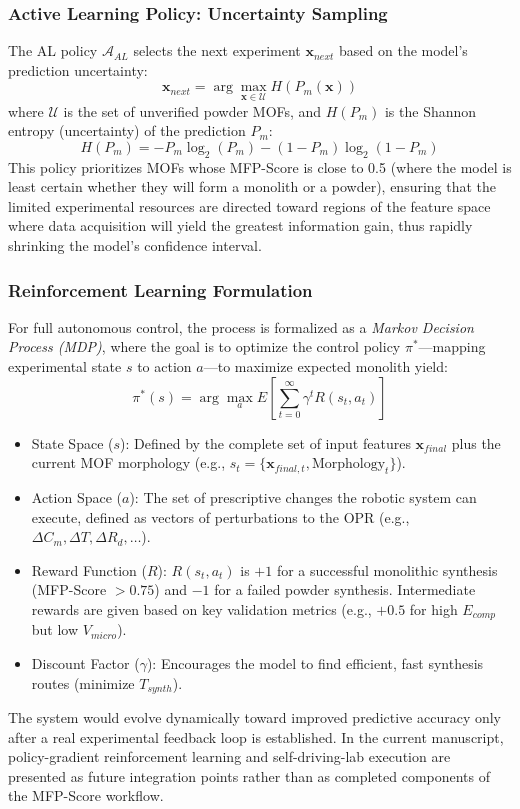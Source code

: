 \documentclass[12pt,a4paper]{article}
\begin{document}
\subsubsection{Active Learning Policy: Uncertainty Sampling}

The AL policy $\mathcal{A}_{AL}$ selects the next experiment $\mathbf{x}_{next}$ based on the model's prediction uncertainty:
\[
\mathbf{x}_{next} = \arg \max_{\mathbf{x} \in \mathcal{U}} H(P_m(\mathbf{x}))
\]
where $\mathcal{U}$ is the set of unverified powder MOFs, and $H(P_m)$ is the Shannon entropy (uncertainty) of the prediction $P_m$:
\[
H(P_m) = -P_m \log_2(P_m) - (1-P_m) \log_2(1-P_m)
\]
This policy prioritizes MOFs whose MFP-Score is close to 0.5 (where the model is least certain whether they will form a monolith or a powder), ensuring that the limited experimental resources are directed toward regions of the feature space where data acquisition will yield the greatest information gain, thus rapidly shrinking the model's confidence interval.

\subsubsection{Reinforcement Learning Formulation}

For full autonomous control, the process is formalized as a \textit{Markov Decision Process (MDP)}, where the goal is to optimize the control policy $\pi^*$—mapping experimental state $s$ to action $a$—to maximize expected monolith yield:
\[
\pi^*(s) = \arg \max_a E\left[\sum_{t=0}^\infty \gamma^t R(s_t, a_t)\right]
\]
\begin{itemize}
    \item State Space ($s$): Defined by the complete set of input features $\mathbf{x}_{final}$ plus the current MOF morphology (e.g., $s_t = \{\mathbf{x}_{final, t}, \text{Morphology}_t\}$).
    \item Action Space ($a$): The set of prescriptive changes the robotic system can execute, defined as vectors of perturbations to the OPR (e.g., $\Delta C_m, \Delta T, \Delta R_d, \dots$).
    \item Reward Function ($R$): $R(s_t, a_t)$ is $+1$ for a successful monolithic synthesis (MFP-Score $> 0.75$) and $-1$ for a failed powder synthesis. Intermediate rewards are given based on key validation metrics (e.g., $+0.5$ for high $E_{comp}$ but low $V_{micro}$).
    \item Discount Factor ($\gamma$): Encourages the model to find efficient, fast synthesis routes ($\text{minimize } T_{synth}$).
\end{itemize}
The system would evolve dynamically toward improved predictive accuracy only after a real experimental feedback loop is established. In the current manuscript, policy-gradient reinforcement learning and self-driving-lab execution are presented as future integration points rather than as completed components of the MFP-Score workflow.\cite{ref19}
\end{document}
